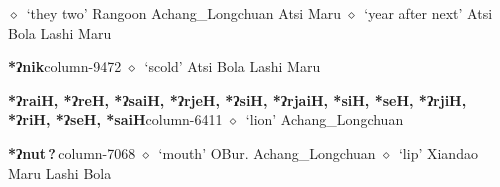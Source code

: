 \hspace{1ex}
         $\diamond$~`they two'
         Rangoon 
\hspace{1ex}
         Achang\_Longchuan 
\hspace{1ex}
         Atsi 
\hspace{1ex}
         Maru 
\hspace{1ex}
         $\diamond$~`year after next'
         Atsi 
\hspace{1ex}
         Bola 
\hspace{1ex}
         Lashi 
\hspace{1ex}
         Maru 
  \item {\footnotesize \textbf{*ʔnik}}{\tiny column-9472}
         $\diamond$~`scold'
         Atsi 
\hspace{1ex}
         Bola 
\hspace{1ex}
         Lashi 
\hspace{1ex}
         Maru 
  \item {\footnotesize \textbf{*ʔraiH, *ʔreH, *ʔsaiH, *ʔrjeH, *ʔsiH, *ʔrjaiH, *siH, *seH, *ʔrjiH, *ʔriH, *ʔseH, *saiH}}{\tiny column-6411}
         $\diamond$~`lion'
         Achang\_Longchuan 
  \item {\footnotesize \textbf{*ʔnut\,?\,}}{\tiny column-7068}
         $\diamond$~`mouth'
         OBur. 
\hspace{1ex}
         Achang\_Longchuan 
\hspace{1ex}
         $\diamond$~`lip'
         Xiandao 
\hspace{1ex}
         Maru 
\hspace{1ex}
         Lashi 
\hspace{1ex}
         Bola 
\hspace{1ex}
